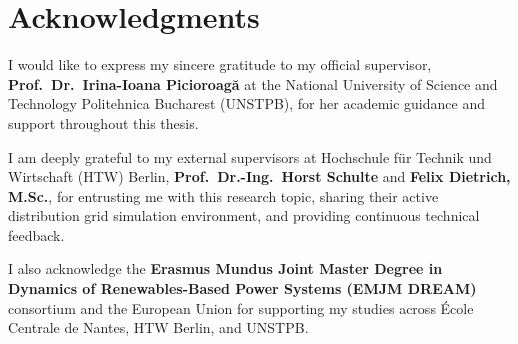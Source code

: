 \chapter*{Acknowledgments}

I would like to express my sincere gratitude to my official supervisor, \textbf{Prof.\ Dr.\ Irina-Ioana Picioroagă} at the National University of Science and Technology Politehnica Bucharest (UNSTPB), for her academic guidance and support throughout this thesis.

I am deeply grateful to my external supervisors at Hochschule f\"ur Technik und Wirtschaft (HTW) Berlin, \textbf{Prof.\ Dr.-Ing.\ Horst Schulte} and \textbf{Felix Dietrich, M.Sc.}, for entrusting me with this research topic, sharing their active distribution grid simulation environment, and providing continuous technical feedback.

I also acknowledge the \textbf{Erasmus Mundus Joint Master Degree in Dynamics of Renewables-Based Power Systems (EMJM DREAM)} consortium and the European Union for supporting my studies across \'Ecole Centrale de Nantes, HTW Berlin, and UNSTPB.

